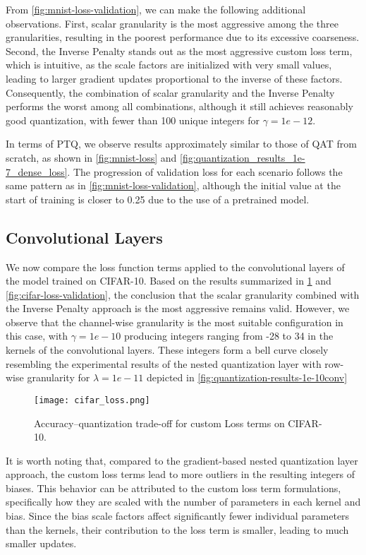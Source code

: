 From \cref{fig:mnist-loss-validation}, we can make the following additional observations.
First, scalar granularity is the most aggressive among the three granularities, 
resulting in the poorest performance due to its excessive coarseness.
Second, the Inverse Penalty stands out as the most aggressive custom loss term,
which is intuitive, as the scale factors are initialized with very small values, 
leading to larger gradient updates proportional to the inverse of these factors.
Consequently, the combination of scalar granularity and the Inverse Penalty performs the worst among all combinations,
although it still achieves reasonably good quantization,
with fewer than 100 unique integers for  \( \gamma = 1e-12 \).


In terms of PTQ, we observe results approximately similar to those of QAT from scratch, 
as shown in \cref{fig:mnist-loss} and \cref{fig:quantization_results_1e-7_dense_loss}. 
The progression of validation loss for each scenario follows the same pattern as in \cref{fig:mnist-loss-validation}, 
although the initial value at the start of training is closer to 0.25 due to the use of a pretrained model.


\newpage


\subsection{Convolutional Layers}
\label{subsec:convolutionallayerscustomloss}

\hspace*{1em} We now compare the loss function terms applied to the convolutional layers of the model trained on CIFAR-10. 
Based on the results summarized in \cref{fig:cifar-loss} and \cref{fig:cifar-loss-validation}, 
the conclusion that the scalar granularity combined with the Inverse Penalty approach is the most aggressive remains valid. 
However, we observe that the channel-wise granularity is the most suitable configuration in this case, 
with \( \gamma = 1e-10 \) producing integers ranging from -28 to 34 in the kernels of the convolutional layers.
These integers form a bell curve closely resembling the experimental results of the nested quantization layer
with row-wise granularity for \( \lambda = 1e-11\) depicted in \cref{fig:quantization-results-1e-10conv}
\begin{figure}[t!]
  \centering
  \texttt{[image: cifar\_loss.png]}
  \caption{Accuracy–quantization trade-off for custom Loss terms on CIFAR-10.}
  \label{fig:cifar-loss}
\end{figure}
It is worth noting that, 
compared to the gradient-based nested quantization layer approach, the custom loss terms
lead to more outliers in the resulting integers of biases.
This behavior can be attributed to the custom loss term formulations, 
specifically how they are scaled with the number of parameters in each kernel and bias.
Since the bias scale factors affect significantly fewer individual parameters than the kernels, 
their contribution to the loss term is smaller, leading to much smaller updates.

